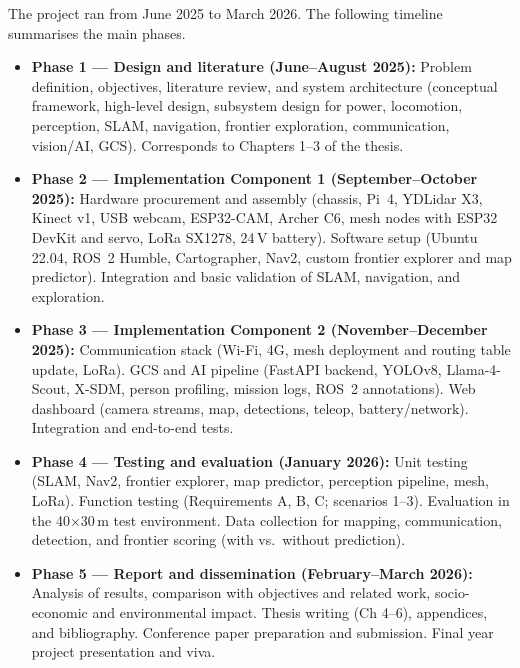 The project ran from June 2025 to March 2026. The following timeline summarises the main phases.

\begin{itemize}
\item \textbf{Phase 1 --- Design and literature (June--August 2025):} Problem definition, objectives, literature review, and system architecture (conceptual framework, high-level design, subsystem design for power, locomotion, perception, SLAM, navigation, frontier exploration, communication, vision/AI, GCS). Corresponds to Chapters 1--3 of the thesis.

\item \textbf{Phase 2 --- Implementation Component 1 (September--October 2025):} Hardware procurement and assembly (chassis, Pi~4, YDLidar X3, Kinect v1, USB webcam, ESP32-CAM, Archer C6, mesh nodes with ESP32 DevKit and servo, LoRa SX1278, 24\,V battery). Software setup (Ubuntu 22.04, ROS~2 Humble, Cartographer, Nav2, custom frontier explorer and map predictor). Integration and basic validation of SLAM, navigation, and exploration.

\item \textbf{Phase 3 --- Implementation Component 2 (November--December 2025):} Communication stack (Wi-Fi, 4G, mesh deployment and routing table update, LoRa). GCS and AI pipeline (FastAPI backend, YOLOv8, Llama-4-Scout, X-SDM, person profiling, mission logs, ROS~2 annotations). Web dashboard (camera streams, map, detections, teleop, battery/network). Integration and end-to-end tests.

\item \textbf{Phase 4 --- Testing and evaluation (January 2026):} Unit testing (SLAM, Nav2, frontier explorer, map predictor, perception pipeline, mesh, LoRa). Function testing (Requirements A, B, C; scenarios 1--3). Evaluation in the 40$\times$30\,m test environment. Data collection for mapping, communication, detection, and frontier scoring (with vs.\ without prediction).

\item \textbf{Phase 5 --- Report and dissemination (February--March 2026):} Analysis of results, comparison with objectives and related work, socio-economic and environmental impact. Thesis writing (Ch 4--6), appendices, and bibliography. Conference paper preparation and submission. Final year project presentation and viva.
\end{itemize}
